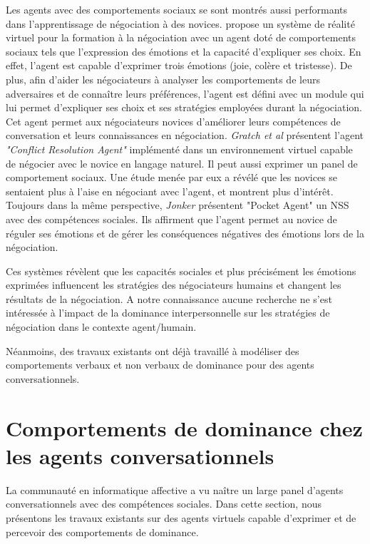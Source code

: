 	 
	 Les agents avec des comportements sociaux se sont montrés aussi performants dans l'apprentissage de négociation à des novices. \cite{broekens2012virtual} propose un système de réalité virtuel pour la formation à la négociation avec un agent doté de comportements sociaux tels que l'expression des émotions et la capacité d'expliquer ses choix. En effet, l'agent est capable d'exprimer trois émotions (joie, colère et tristesse). De plus, afin d'aider les négociateurs à analyser les comportements de leurs adversaires et de connaître leurs préférences, l'agent est défini avec un module qui lui permet d'expliquer ses choix et ses stratégies employées durant la négociation. Cet agent permet aux négociateurs novices d'améliorer leurs compétences de conversation et leurs connaissances en négociation. 
	 \emph{Gratch et al} \cite{gratch2016benefits} présentent l'agent \textit{"Conflict Resolution Agent"} implémenté dans un environnement virtuel capable de négocier avec le novice en langage naturel. Il peut aussi exprimer un panel de comportement sociaux. Une étude menée par eux a révélé que les novices se sentaient plus à l'aise en négociant avec l'agent, et montrent plus d'intérêt. Toujours dans la même perspective, \emph{Jonker} \cite{jonker2012negotiating} présentent "Pocket Agent" un NSS avec des compétences sociales. Ils affirment que l'agent permet au novice de réguler ses émotions et de gérer les conséquences négatives des émotions lors de la négociation.
	 
	 Ces systèmes révèlent que les capacités sociales et plus précisément les émotions exprimées influencent les stratégies des négociateurs humains et changent les résultats de la négociation. A notre connaissance aucune recherche ne s'est intéressée à l'impact de la dominance interpersonnelle sur les stratégies de négociation dans le contexte agent/humain. 
	 
	 Néanmoins, des travaux existants ont déjà travaillé à modéliser des comportements verbaux et non verbaux de dominance pour des agents conversationnels. 
	 
	 \section{Comportements de dominance chez les agents conversationnels}
	 
	 	La communauté en informatique affective a vu naître un large panel d'agents conversationnels avec des compétences sociales. Dans cette section, nous présentons les travaux existants sur des agents virtuels capable d'exprimer et de percevoir des comportements de dominance. 
	 	
